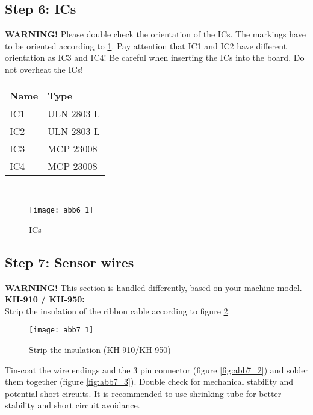 \documentclass[fleqn,10pt]{SelfArx} %
\begin{document}
\FloatBarrier

 \subsection*{Step 6: ICs}

\textbf{WARNING!} Please double check the orientation of the ICs. The markings have to be oriented according to \ref{fig:abb6_1}. Pay attention that IC1 and IC2 have different orientation as IC3 and IC4! Be careful when inserting the ICs into the board. Do not overheat the ICs!\\
\begin{tabular}{ll}
\hline
\textbf{Name} & \textbf{Type} \\ \hline
IC1           & ULN 2803 L   \\ \hline
IC2           & ULN 2803 L   \\ \hline
IC3           & MCP 23008    \\ \hline
IC4           & MCP 23008    \\ \hline
\end{tabular}\\

\begin{figure}[tbhp]\centering
\texttt{[image: abb6\_1]}
\caption{ICs}
\label{fig:abb6_1}
\end{figure}

\FloatBarrier

 \subsection*{Step 7: Sensor wires}

\textbf{WARNING!} This section is handled differently, based on your machine model.\\

\textbf{KH-910 / KH-950:} \\

Strip the insulation of the ribbon cable according to figure \ref{fig:abb7_1}.

\begin{figure}[tbhp]\centering
\texttt{[image: abb7\_1]}
\caption{Strip the insulation (KH-910/KH-950)}
\label{fig:abb7_1}
\end{figure}

Tin-coat the wire endings and the 3 pin connector (figure \ref{fig:abb7_2}) and solder them together (figure \ref{fig:abb7_3}). Double check for mechanical stability and potential short circuits. It is recommended to use shrinking tube for better stability and short circuit avoidance.
\end{document}
